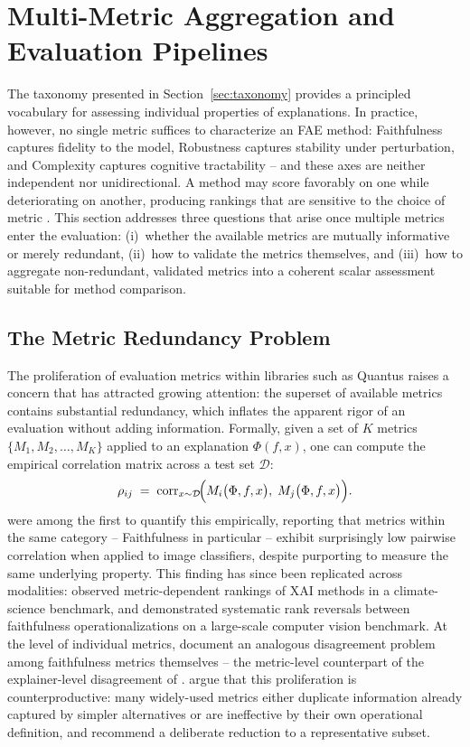 \section{Multi-Metric Aggregation and Evaluation Pipelines}
\label{sec:multi-metric-aggregation}

The taxonomy presented in Section~\ref{sec:taxonomy} provides a principled
vocabulary for assessing individual properties of explanations. In practice,
however, no single metric suffices to characterize an FAE method: Faithfulness
captures fidelity to the model, Robustness captures stability under
perturbation, and Complexity captures cognitive tractability -- and these axes
are neither independent nor unidirectional. A method may score favorably on one
while deteriorating on another, producing rankings that are sensitive to the
choice of metric \citep{krishna2024disagreement, hedstrom2024metaquantus}. This
section addresses three questions that arise once multiple metrics enter the
evaluation: (i)~whether the available metrics are mutually informative or
merely redundant, (ii)~how to validate the metrics themselves, and (iii)~how
to aggregate non-redundant, validated metrics into a coherent scalar
assessment suitable for method comparison.

\subsection{The Metric Redundancy Problem}
\label{subsec:redundancy}

The proliferation of evaluation metrics within libraries such as Quantus
\citep{hedstrom2023quantus} raises a concern that has attracted growing
attention: the superset of available metrics contains substantial redundancy,
which inflates the apparent rigor of an evaluation without adding information.
Formally, given a set of $K$ metrics $\{M_1, M_2, \dots, M_K\}$ applied to an
explanation $\Phi(f, x)$, one can compute the empirical correlation matrix
across a test set $\mathcal{D}$:
$$
\rho_{ij} \;=\; \operatorname{corr}_{x \sim \mathcal{D}}\!\Bigl(
    M_i\bigl(\Phi, f, x\bigr),\; M_j\bigl(\Phi, f, x\bigr)
\Bigr).
$$
\citet{tomsett2020sanity} were among the first to quantify this empirically,
reporting that metrics within the same category -- Faithfulness in
particular -- exhibit surprisingly low pairwise correlation when applied to
image classifiers, despite purporting to measure the same underlying property.
This finding has since been replicated across modalities:
\citet{bommer2024finding} observed metric-dependent rankings of XAI methods in
a climate-science benchmark, and \citet{klein2024navigating} demonstrated
systematic rank reversals between faithfulness operationalizations on a
large-scale computer vision benchmark. At the level of individual metrics,
\citet{barr2023disagreement} document an analogous disagreement problem among
faithfulness metrics themselves -- the metric-level counterpart of the
explainer-level disagreement of \citet{krishna2024disagreement}. \citet{pawlicki2024necessity} argue that
this proliferation is counterproductive: many widely-used metrics either
duplicate information already captured by simpler alternatives or are
ineffective by their own operational definition, and recommend a deliberate
reduction to a representative subset.

